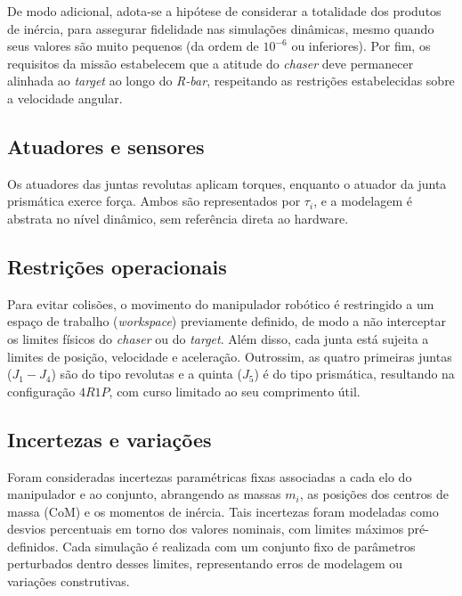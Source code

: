 De modo adicional, adota-se a hipótese de considerar a totalidade dos produtos de inércia, para assegurar fidelidade nas simulações dinâmicas, mesmo quando seus valores são muito pequenos (da ordem de $10^{-6}$ ou inferiores).
Por fim, os requisitos da missão estabelecem que a atitude do \emph{chaser} deve permanecer alinhada ao \emph{target} ao longo do \emph{R-bar}, respeitando as restrições estabelecidas sobre a velocidade angular.

\subsection{Atuadores e sensores}
Os atuadores das juntas revolutas aplicam torques, enquanto o atuador da junta prismática exerce força.
Ambos são representados por $\tau_i$, e a modelagem é abstrata no nível dinâmico, sem referência direta ao hardware.

\subsection{Restrições operacionais}
Para evitar colisões, o movimento do manipulador robótico é restringido a um espaço de trabalho (\emph{workspace}) previamente definido, de modo a não interceptar os limites físicos do \emph{chaser} ou do \emph{target}.
Além disso, cada junta está sujeita a limites de posição, velocidade e aceleração.
Outrossim, as quatro primeiras juntas ($J_1 - J_4$) são do tipo revolutas e a quinta ($J_5$) é do tipo prismática, resultando na configuração $4R1P$, com curso limitado ao seu comprimento útil.




\subsection{Incertezas e variações}
Foram consideradas incertezas paramétricas fixas associadas a cada elo do manipulador e ao conjunto, abrangendo as massas $m_i$, as posições dos centros de massa (CoM) e os momentos de inércia.
Tais incertezas foram modeladas como desvios percentuais em torno dos valores nominais, com limites máximos pré-definidos.
Cada simulação é realizada com um conjunto fixo de parâmetros perturbados dentro desses limites, representando erros de modelagem ou variações construtivas.  

